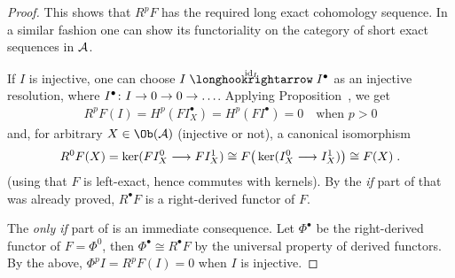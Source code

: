\documentclass[a4paper,parskip=half,numbers=enddot, DIV=12]{scrreprt}
\begin{document}
\begin{proof}
		This shows that $R^pF$ has the required long exact cohomology sequence. In a similar fashion one can show its functoriality on the category of short exact sequences in $\mathcal{A}$.
		
		If $I$ is injective, one can choose $I\monomorphism[\id_I]I^\bullet $ as an injective resolution, where $I^\bullet \colon I\morphism 0\morphism 0\morphism\ldots$. Applying Proposition~, we get 
		\begin{align*}
			R^pF(I)=H^p(FI_X^\bullet )=H^p(FI^\bullet )=0\quad\text{when }p>0
		\end{align*}
		and, for arbitrary $X\in\Ob(\Aa)$ (injective or not), a canonical isomorphism
		\begin{align*}
			R^0F(X)=\ker(FI_X^0\morphism FI_X^1)\cong F\big(\ker(I_X^0\morphism I_X^1)\big)\cong F(X)\;.
		\end{align*}
		(using that $F$ is left-exact, hence commutes with kernels). By the \emph{if} part of  that was already proved, $R^\bullet F$ is a right-derived functor of $F$.
		
		The \emph{only if} part of  is an immediate consequence. Let $\Phi^\bullet $ be the right-derived functor of $F=\Phi^0$, then $\Phi^\bullet \cong R^\bullet F$ by the universal property of derived functors. By the above, $\Phi^pI=R^pF(I)=0$ when $I$ is injective.
		

\end{proof}
\end{document}
